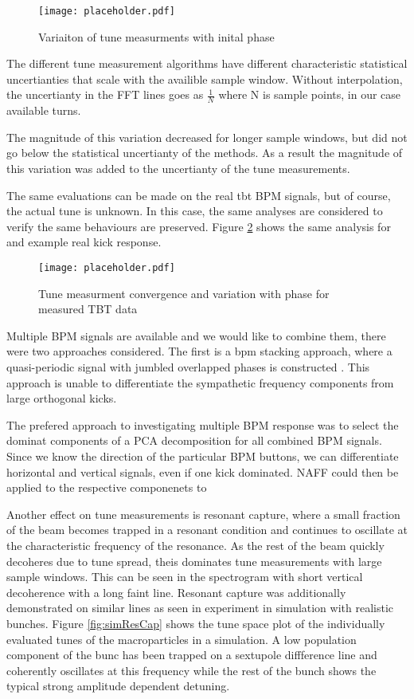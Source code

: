 \begin{figure}
	\centering
	\texttt{[image: placeholder.pdf]}
	\caption{Variaiton of tune measurments with inital phase}
	\label{fig:baseRoll}
\end{figure}

The different tune measurement algorithms have different characteristic statistical uncertianties that scale with the availible sample window. Without interpolation, the uncertianty in the FFT lines goes as $\frac{1}{N}$ where N is sample points, in our case available turns.

The magnitude of this variation decreased for longer sample windows, but did not go below the statistical uncertianty of the methods. As a result the magnitude of this variation was added to the uncertianty of the tune measurements.


The same evaluations can be made on the real tbt BPM signals, but of course, the actual tune is unknown. In this case, the same analyses are considered to verify the same behaviours are preserved. Figure \ref{fig:measConvRoll} shows the same analysis for and example real kick response.

\begin{figure}
	\centering
	\texttt{[image: placeholder.pdf]}
	\caption{Tune measurment convergence and variation with phase for measured TBT data}
	\label{fig:measConvRoll}
\end{figure}


Multiple BPM signals are available and we would like to combine them, there were two approaches considered. The first is a bpm stacking approach, where a quasi-periodic signal with jumbled overlapped phases is constructed \cite{zisopolous}. This approach is unable to differentiate the sympathetic frequency components from large orthogonal kicks. 

The prefered approach to investigating multiple BPM response was to select the dominat components of a PCA decomposition for all combined BPM signals. Since we know the direction of the particular BPM buttons, we can differentiate horizontal and vertical signals, even if one kick dominated. NAFF could then be applied to the respective componenets to 

Another effect on tune measurements is resonant capture, where a small fraction of the beam becomes trapped in a resonant condition and continues to oscillate at the characteristic frequency of the resonance. As the rest of the beam quickly decoheres due to tune spread, theis dominates tune measurements with large sample windows. This can be seen in the spectrogram with short vertical decoherence with a long faint line. Resonant capture was additionally demonstrated on similar lines as seen in experiment in simulation with realistic bunches. Figure \ref{fig:simResCap} shows the tune space plot of the individually evaluated tunes of the macroparticles in a simulation. A low population component of the bunc has been trapped on a sextupole diffference line and coherently oscillates at this frequency while the rest of the bunch shows the typical strong amplitude dependent detuning. 

